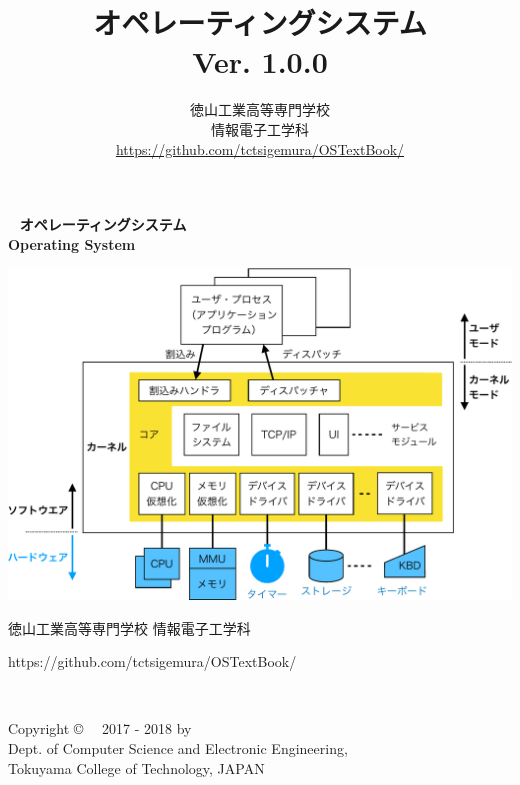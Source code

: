 \documentclass[a4paper,11pt,twocolumn]{ltjsbook}     %
\newcommand{\ver}{Ver. 1.0.0}
\begin{document}
\setcounter{page}{0}
\thispagestyle{empty}
\onecolumn
~
\vfill
\vfill
{\noindent
\fontsize{34pt}{50pt}\selectfont\textbf{オペレーティングシステム}\\
\fontsize{34pt}{50pt}\selectfont\textbf{Operating System}
}
\vfill
\vfill
\centerline{
  \includegraphics[scale=0.77]{Fig/osOrganization-crop.pdf}
}
\vfill
\vfill
\centerline{\Large 徳山工業高等専門学校 情報電子工学科}
\centerline{\Large\ttfamily https://github.com/tctsigemura/OSTextBook/}
\vfill

\frontmatter
\title{オペレーティングシステム\\{\ver}}
\author{徳山工業高等専門学校\\情報電子工学科\\
\url{https://github.com/tctsigemura/OSTextBook/}}
\date{}
\maketitle

\thispagestyle{empty}
\onecolumn
~
\vfill
\begin{flushleft}
Copyright \copyright ~~ 2017 - 2018 by \\
Dept. of Computer Science and Electronic Engineering, \\
Tokuyama College of Technology, JAPAN
\end{flushleft}
\vspace{0.8cm}
\end{document}
